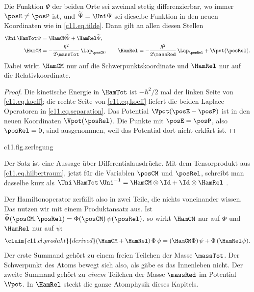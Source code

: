 \begin{theorem}\label{c11.thm.separation}
  Die Funktion $\Psi$ der beiden Orte sei zweimal stetig differenzierbar, wo immer
  $\posE \neq \posP$ ist, und $\widetilde{\Psi} = \Uni\Psi$ sei dieselbe Funktion in den
  neuen Koordinaten wie in \eqref{c11.eq.tilde}. Dann gilt an allen diesen Stellen
  \begin{equation}\label{c11.eq.separation}
    \begin{aligned}
      \Uni\,\HamTot\Psi &= \HamCM\widetilde{\Psi} + \HamRel\widetilde{\Psi}, \\
      \HamCM &= -\frac{\hbar^2}{2\massTot}\,\Lap_{\posCM},
      \qquad
      \HamRel = -\frac{\hbar^2}{2\massRed}\,\Lap_{\posRel} + \Vpot(\posRel).
    \end{aligned}
  \end{equation}
  Dabei wirkt $\HamCM$ nur auf die Schwerpunktskoordinate und $\HamRel$ nur auf die
  Relativkoordinate.
\end{theorem}
\begin{proof}
  Die kinetische Energie in $\HamTot$ ist $-\hbar^2/2$ mal der linken Seite von
  \eqref{c11.eq.koeff}; die rechte Seite von \eqref{c11.eq.koeff} liefert die beiden
  Laplace-Operatoren in \eqref{c11.eq.separation}. Das Potential
  $\Vpot(\posE - \posP)$ ist in den neuen Koordinaten $\Vpot(\posRel)$. Die Punkte mit
  $\posE = \posP$, also $\posRel = 0$, sind ausgenommen, weil das Potential dort nicht
  erklärt ist.
\end{proof}

\begin{tpcfigure}{c11.fig.zerlegung}
  \caption{Theorem~\ref{c11.thm.separation} als Schema; die Längen im Bild bedeuten nichts. Links das Atom, wie es dasteht: zwei Teilchen, gekoppelt durch das Potential. Rechts dasselbe System in den neuen Koordinaten: ein freies Teilchen der Masse $\massTot$ und, unabhängig davon, ein Teilchen der Masse $\massRed$ im Potential $\Vpot$.}
\end{tpcfigure}

Der Satz ist eine Aussage über Differentialausdrücke. Mit dem Tensorprodukt aus
\eqref{c11.eq.hilbertraum}, jetzt für die Variablen $\posCM$ und $\posRel$, schreibt man
dasselbe kurz als $\Uni\,\HamTot\,\Uni^{-1} = \HamCM \otimes \Id + \Id \otimes \HamRel$
.

Der Hamiltonoperator zerfällt also in zwei Teile, die nichts voneinander wissen. Das
nutzen wir mit einem Produktansatz aus. Ist $\widetilde{\Psi}(\posCM, \posRel) =
\Phi(\posCM)\,\psi(\posRel)$, so wirkt $\HamCM$ nur auf $\Phi$ und $\HamRel$ nur auf
$\psi$:
\begin{equation}\label{c11.eq.produkt}\claim{c11.cl.produkt}{derived}
  (\HamCM + \HamRel)\,\Phi\,\psi
  = (\HamCM\Phi)\,\psi + \Phi\,(\HamRel\psi).
\end{equation}
Der erste Summand gehört zu einem freien Teilchen der Masse $\massTot$. Der Schwerpunkt
des Atoms bewegt sich also, als gäbe es das Innenleben nicht. Der zweite Summand gehört
zu \emph{einem} Teilchen der Masse $\massRed$ im Potential $\Vpot$. In $\HamRel$ steckt
die ganze Atomphysik dieses Kapitels.

